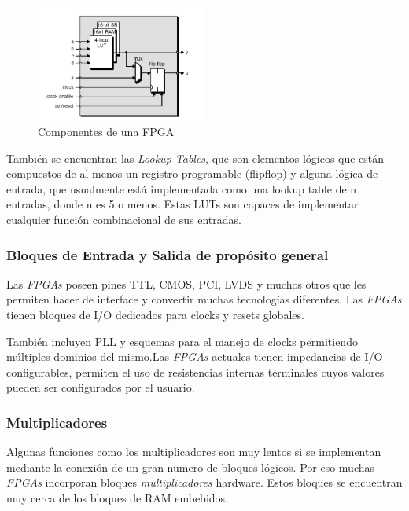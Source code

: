 \begin{figure}[h!]
 \begin{center}
 \includegraphics[width=0.5\textwidth,keepaspectratio=true]{./images/celda}
  \caption{Componentes de una FPGA}
  \label{fig:esquema}
 \end{center}
\end{figure}

También se encuentran las \textit{Lookup Tables}, que son elementos lógicos que están compuestos de al menos un registro programable (flip\-flop) y alguna lógica de entrada, que usualmente está implementada como una lookup table de n entradas, donde n es 5 o menos. Estas LUTs son capaces de implementar cualquier función combinacional de sus entradas.

	\subsubsection{Bloques de Entrada y Salida de propósito general}

Las \textit{FPGAs} poseen pines TTL, CMOS, PCI, LVDS y muchos otros que les permiten hacer de interface y convertir muchas tecnologías diferentes. Las \textit{FPGAs} tienen bloques de I/O dedicados para clocks y resets globales.  

También incluyen PLL y esquemas para el manejo de clocks permitiendo múltiples dominios del mismo.Las \textit{FPGAs} actuales tienen impedancias de I/O configurables,  permiten el uso de resistencias internas terminales cuyos valores pueden ser configurados por el usuario.

\subsubsection{Multiplicadores}

Algunas funciones como los multiplicadores son muy lentos si se implementan mediante la conexión de un gran numero de bloques lógicos. Por eso muchas \textit{FPGAs} incorporan bloques \textit{multiplicadores} hardware. Estos bloques se encuentran muy cerca de los bloques de RAM embebidos. 

